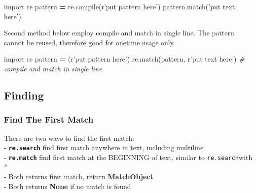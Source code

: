 \documentclass[
]{book}
\newenvironment{Shaded}{\begin{snugshade}}{\end{snugshade}}
\newcommand{\BuiltInTok}[1]{#1}
\newcommand{\CommentTok}[1]{\textcolor[rgb]{0.37,0.37,0.37}{\textit{#1}}}
\newcommand{\ImportTok}[1]{#1}
\newcommand{\NormalTok}[1]{#1}
\newcommand{\OperatorTok}[1]{\textcolor[rgb]{0.43,0.43,0.43}{\textbf{#1}}}
\newcommand{\StringTok}[1]{\textcolor[rgb]{0.5,0.5,0.5}{#1}}
\newcommand{\VerbatimStringTok}[1]{\textcolor[rgb]{0.5,0.5,0.5}{#1}}
\begin{document}
\begin{Shaded}
\begin{Highlighting}[]
\ImportTok{import}\NormalTok{ re}
\NormalTok{pattern }\OperatorTok{=}\NormalTok{ re.}\BuiltInTok{compile}\NormalTok{(}\VerbatimStringTok{r'put pattern here'}\NormalTok{)}
\NormalTok{pattern.match(}\StringTok{'put text here'}\NormalTok{)}
\end{Highlighting}
\end{Shaded}

Second method below employ compile and match in single line. The pattern cannot be reused, therefore good for onetime usage only.

\begin{Shaded}
\begin{Highlighting}[]
\ImportTok{import}\NormalTok{ re}
\NormalTok{pattern }\OperatorTok{=}\NormalTok{ (}\VerbatimStringTok{r'put pattern here'}\NormalTok{)}
\NormalTok{re.match(pattern, }\VerbatimStringTok{r'put text here'}\NormalTok{)  }\CommentTok{# compile and match in single line}
\end{Highlighting}
\end{Shaded}

\hypertarget{finding}{%
\subsection{Finding}\label{finding}}

\hypertarget{find-the-first-match}{%
\subsubsection{Find The First Match}\label{find-the-first-match}}

There are two ways to find the first match:\\
- \textbf{\texttt{re.search}} find first match anywhere in text, including multiline\\
- \textbf{\texttt{re.match}} find first match at the BEGINNING of text, similar to \texttt{re.search}with \texttt{\^{}}\\
- Both returns first match, return \textbf{MatchObject}\\
- Both returns \textbf{None} if no match is found
\end{document}
